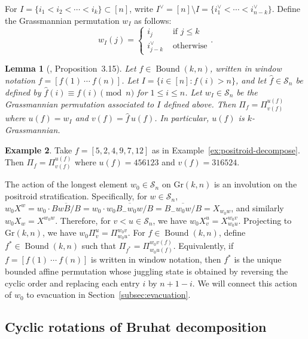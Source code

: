 \documentclass[12pt,reqno]{amsart}
\newtheorem{lemma}{Lemma}[section]
\theoremstyle{definition}
\newtheorem{example}[lemma]{Example}
\newcommand{\symm}{\mathcal{S}}
\newcommand{\gr}{\mathrm{Gr}}
\newcommand{\bound}{\operatorname{Bound}}
\begin{document}
{For $I = \{i_1<i_2<\cdots<i_k\}\subset [n]$, write $I^{\vee} = [n]\setminus I = \{i^\vee_1<\cdots<i^\vee_{n-k}\}$. Define the Grassmannian permutation $w_I$ as follows: 
\[w_I(j) = \begin{cases}
    i_j & \text{ if }j\leq k\\
    i^{\vee}_{j-k} & \text{ otherwise}
\end{cases}.\]

\begin{lemma}[\cite{KLS13juggling}, Proposition~3.15]\label{lemma:wtouv}
Let \(f\in \bound(k,n)\), written in window notation \(f=[f(1)\ \cdots\ f(n)]\).
Let \(I=\{i\in[n]: f(i)>n\}\), and let \(\widehat f\in\symm_n\) be defined by
\(\widehat f(i)\equiv f(i)\pmod n\) for \(1\le i\le n\).
Let \(w_I\in\symm_n\) be the Grassmannian permutation associated to \(I\) defined above.
Then \(\Pi_f=\Pi_{v(f)}^{u(f)}\) where \(u(f)=w_I\) and \(v(f)=\widehat f\,u(f)\).
In particular, \(u(f)\) is \(k\)-Grassmannian.
\end{lemma}



\begin{example}
    Take $f=[5,2,4,9,7,12]$ as in Example~\ref{ex:positroid-decompose}. Then $\Pi_f=\Pi_{v(f)}^{u(f)}$ where $u(f)=456123$ and $v(f)=316524$.
\end{example}

The action of the longest element $w_0\in \symm_n$ on $\gr(k,n)$ is an involution on the positroid stratification. Specifically, for $w\in \symm_n$, $w_0X^w=w_0\cdot\overline{BwB/B}=w_0\cdot\overline{w_0B_-w_0w/B}=\overline{B_-w_0w/B}=X_{w_0w}$, and similarly
$w_0X_w=X^{w_0w}$. Therefore, for $v<u\in \symm_n$, we have $w_0X_v^u=X^{w_0v}_{w_0u}$. Projecting to $\gr(k,n)$, we have $w_0\Pi_v^u=\Pi_{w_0u}^{w_0v}$. 
For $f\in \bound(k,n)$, define $f^*\in \bound(k,n)$ such that $\Pi_{f^*}=\Pi^{w_0v(f)}_{w_0u(f)}$.
Equivalently, if \(f=[f(1)\ \cdots\ f(n)]\) is written in window notation, then
\(f^*\) is the unique bounded affine permutation whose juggling state is obtained
by reversing the cyclic order and replacing each entry \(i\) by \(n+1-i\).
We will connect this action of $w_0$ to evacuation in Section~\ref{subsec:evacuation}. 
\subsection{Cyclic rotations of Bruhat decomposition}

}
\end{document}
